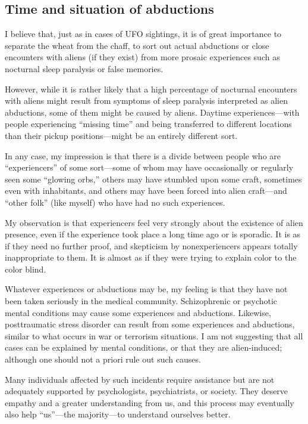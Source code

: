 \subsection{Time and situation of abductions}

I believe that, just as in cases of UFO sightings, it is of great importance to separate the wheat from the chaff,
to sort out actual abductions or close encounters with aliens (if they exist)
from more prosaic experiences such as nocturnal sleep paralysis or false memories.

However, while it is rather likely that a high percentage of nocturnal encounters with aliens might result from
symptoms of sleep paralysis interpreted as alien abductions, some of them might be caused by aliens.
Daytime experiences---with people experiencing ``missing time'' and being transferred to different locations than their pickup positions---might
be an entirely different sort.

In any case, my impression is that there is a divide between people who are ``experiencers'' of some sort---some of whom may have occasionally
or regularly seen some ``glowing orbs,'' others may have stumbled upon some craft, sometimes even with inhabitants, and others may have
been forced into alien craft---and ``other folk'' (like myself) who have had no such experiences.

My observation is that experiencers feel very strongly about the existence of alien presence, even if the experience took place a long time ago or is sporadic.
It is as if they need no further proof, and skepticism by nonexperiencers appears totally inappropriate to them.
It is almost as if they were trying to explain color to the color blind.

Whatever experiences or abductions may be, my feeling is that they have not been taken seriously in the medical community.
Schizophrenic or psychotic mental conditions may cause some experiences and abductions.
Likewise, posttraumatic stress disorder can result from some experiences and abductions, similar to what occurs in war or terrorism situations.
I am not suggesting that all cases can be explained by mental conditions, or that they are alien-induced; although one should not a priori rule out such causes.

Many individuals affected by such incidents require assistance but are not adequately supported by psychologists, psychiatrists, or society. They deserve empathy and a greater understanding from us,
and this process may eventually also help ``us''---the majority---to understand ourselves better.


